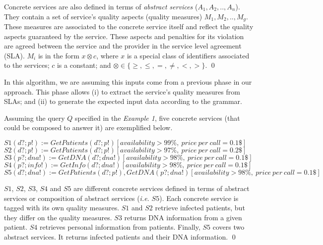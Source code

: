 \begin{definition}
%
Concrete services are also defined in terms of \textit{abstract services} ($A_{1}, A_{2}, .., A_{n}$).
They contain a set of service's quality aspects (quality measures) $M_{1},M_{2}, .., M_{g}$. These measures are  associated to the concrete service itself and reflect the quality aspects guaranteed by the service. These aspects and penalties for its violation are agreed between the service and the provider in the service level agreement (SLA).
%
%
$M_{i}$ is in the form $x \otimes c$, where $x$ is a special class of identifiers associated to the services; $c$ is a constant; and $\otimes \in\lbrace \geq, \leq, =, \neq, <, >\rbrace$.
\qed
\end{definition}


In this algorithm, we are assuming this inputs come from a previous phase in our approach.
This phase allows (i) to extract the service's quality measures from SLAs; and (ii) to generate the expected input data according to the grammar.

\begin{example}
%
Assuming the query $Q$ specified in the \textit{Example 1}, five concrete services (that could be composed to answer it) are exemplified below. 
\begin{flushleft}
\small
$S1(d?; p!) := GetPatients(d?; p!)[availability > 99\%, \ price \ per \ call = 0.1\$]$ 
\\
$S2(d?; p!) := GetPatients(d?; p!)[availability > 97\%, \ price \ per \ call = 0.2\$]$
\\
$S3(p?; dna!) := GetDNA(d?; dna!)[availability > 98\%, \ price \ per \ call = 0.1\$]$
\\
$S4(p?; info!) := GetInfo(d?; dna!)[availability > 98\%, \ price \ per \ call = 0.1\$]$
\\
$S5(d?; dna!) := GetPatients(d?; p!), GetDNA(p?; dna!)[availability > 98\%, \ price \ per \ call = 0.1\$]$
\end{flushleft}
$S1$, $S2$, $S3$, $S4$ and $S5$ are different concrete services defined in terms of abstract services or composition of abstract services (\textit{i.e.} $S5$). Each concrete service is tagged with its own quality measures. $S1$ and $S2$ retrieve infected patients, but they differ on the quality measures. $S3$ returns DNA information from a given patient. $S4$ retrieves personal information from patients. Finally, $S5$ covers two abstract services. It returns infected patients and their DNA information. 
\qed
\end{example}

